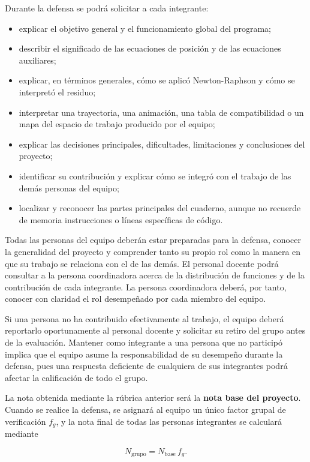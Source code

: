 \documentclass[12pt]{article}
\begin{document}
Durante la defensa se podrá solicitar a cada integrante:

\begin{itemize}
    \item explicar el objetivo general y el funcionamiento global del programa;
    \item describir el significado de las ecuaciones de posición y de las ecuaciones auxiliares;
    \item explicar, en términos generales, cómo se aplicó Newton-Raphson y cómo se interpretó el residuo;
    \item interpretar una trayectoria, una animación, una tabla de compatibilidad o un mapa del espacio de trabajo producido por el equipo;
    \item explicar las decisiones principales, dificultades, limitaciones y conclusiones del proyecto;
    \item identificar su contribución y explicar cómo se integró con el trabajo de las demás personas del equipo;
    \item localizar y reconocer las partes principales del cuaderno, aunque no recuerde de memoria instrucciones o líneas específicas de código.
\end{itemize}

Todas las personas del equipo deberán estar preparadas para la defensa, conocer la generalidad del proyecto y comprender tanto su propio rol como la manera en que su trabajo se relaciona con el de las demás. El personal docente podrá consultar a la persona coordinadora acerca de la distribución de funciones y de la contribución de cada integrante. La persona coordinadora deberá, por tanto, conocer con claridad el rol desempeñado por cada miembro del equipo.

Si una persona no ha contribuido efectivamente al trabajo, el equipo deberá reportarlo oportunamente al personal docente y solicitar su retiro del grupo antes de la evaluación. Mantener como integrante a una persona que no participó implica que el equipo asume la responsabilidad de su desempeño durante la defensa, pues una respuesta deficiente de cualquiera de sus integrantes podrá afectar la calificación de todo el grupo.

La nota obtenida mediante la rúbrica anterior será la \textbf{nota base del proyecto}. Cuando se realice la defensa, se asignará al equipo un único factor grupal de verificación \(f_g\), y la nota final de todas las personas integrantes se calculará mediante

\[
N_{\mathrm{grupo}}=N_{\mathrm{base}}\,f_g.
\]
\end{document}
